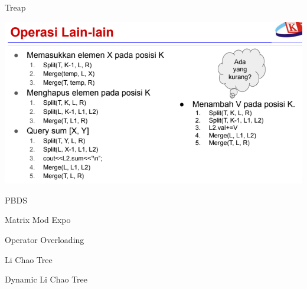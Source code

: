 \documentclass{article}
\newcommand{\mytitle}[1]{
    \begin{center}
        {\LARGE #1} \\[0.5cm]
    \end{center}
}
\begin{document}
\mytitle{Treap}



\includegraphics[width=0.8\linewidth]{../data-structures/treap-operations.png}

\pagebreak

\mytitle{PBDS}



\pagebreak

\mytitle{Matrix Mod Expo}



\pagebreak

\mytitle{Operator Overloading}



\pagebreak

\mytitle{Li Chao Tree}



\pagebreak

\mytitle{Dynamic Li Chao Tree}



\pagebreak
\end{document}
